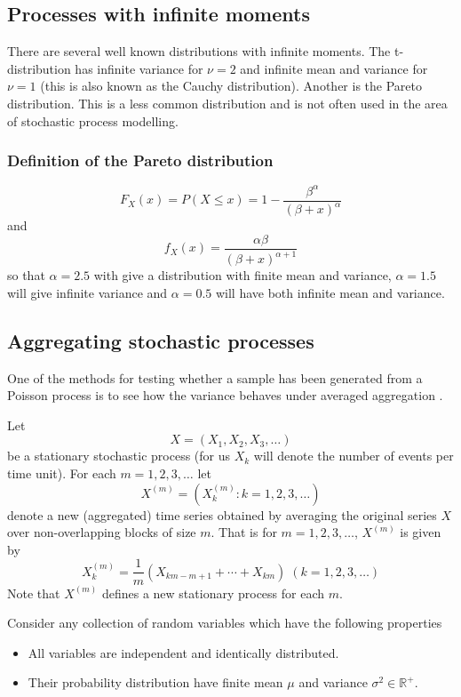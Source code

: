 \subsection{Processes with infinite moments}

There are several well known distributions with infinite moments.  The
t-distribution has infinite variance for $\nu = 2$ and infinite mean
and variance for $\nu = 1$ (this is also known as the Cauchy
distribution).  Another is the Pareto distribution.  This is a less
common distribution and is not often used in the area of stochastic
process modelling.

\subsubsection{Definition of the Pareto distribution}

\[
F_X(x) = P(X \leq x) = 1 - \frac{\beta^\alpha}{(\beta + x)^\alpha}
\]
and
\[
f_X(x) = \frac{\alpha \beta}{(\beta + x)^{\alpha + 1}}
\]
so that $\alpha = 2.5$ with give a distribution with finite mean and
variance, $\alpha = 1.5$ will give infinite variance and $\alpha =
0.5$ will have both infinite mean and variance.

\subsection{Aggregating stochastic processes}
\label{models:aggregation}

One of the methods for testing whether a sample has been generated
from a Poisson process is to see how the variance behaves under
averaged aggregation \cite{Bell:5}.

Let
\[
X = (X_1, X_2, X_3, \ldots)
\]
be a stationary stochastic process (for us $X_k$ will denote the
number of events per time unit).  For each $m = 1,2,3,\dots$ let
\[
X^{(m)} = (X^{(m)}_k : k = 1,2,3,\ldots) 
\]
denote a new (aggregated) time series obtained by averaging the original
series $X$ over non-overlapping blocks of size $m$.  That is for $m =
1,2,3,\ldots$, $X^{(m)}$ is given by
\begin{equation}
X^{(m)}_k = \frac{1}{m}(X_{km - m + 1} + \cdots + X_{km}) \; (k = 1,2,3,\ldots)
\label{models:eq1}
\end{equation}
Note that $X^{(m)}$ defines a new stationary process for each $m$.
 

Consider any collection of random variables which have the following
properties

\begin{itemize}

\item	All variables are independent and identically distributed.

\item	Their probability distribution have finite mean $\mu$ and
variance $\sigma^2 \in {\mathbb R}^+$.

\end{itemize}

